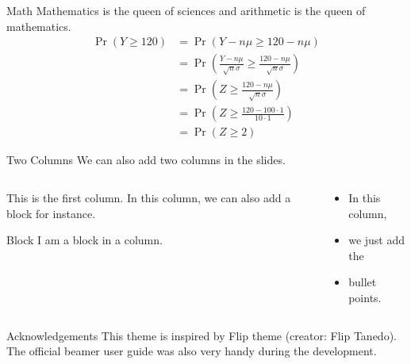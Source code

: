 \documentclass[aspectratio=169]{beamer}
\begin{document}
	\begin{frame}{Math}
		Mathematics is the queen of sciences and arithmetic is the queen of mathematics.
		\begin{align*}
			\Pr(Y \geq 120) &= \Pr\left(Y-n\mu \geq 120-n\mu \right)\\
			&= \Pr\left( \frac{Y-n\mu }{\sqrt{n}\sigma} \geq \frac{120-n\mu }{\sqrt{n}\sigma} \right)\\
			&=\Pr\left( Z \geq \frac{120-n\mu }{\sqrt{n}\sigma} \right)\\
			&=\Pr\left( Z \geq \frac{120-100 \cdot 1 }{10 \cdot 1} \right)\\
			&=\Pr\left( Z \geq 2\right)
		\end{align*}
	\end{frame}

	\begin{frame}{Two Columns}
		We can also add two columns in the slides.
		\begin{columns}[t]
			\begin{column}[T]{0.4\textwidth}
				This is the first column. In this column, we can also add a block for instance.
				\vspace{1em}
				\begin{block}{Block}
					I am a block in a column.
				\end{block}
			\end{column}
			\begin{column}[T]{0.4\textwidth}
				\begin{itemize}
					\item In this column,
					\item we just add the
					\item bullet points.
				\end{itemize}
			\end{column}
		\end{columns}
	\end{frame}
	\begin{frame}{Acknowledgements}
		This theme is inspired by Flip theme (creator: Flip Tanedo). The official beamer user guide was also very handy during the development.
	\end{frame}
\end{document}
